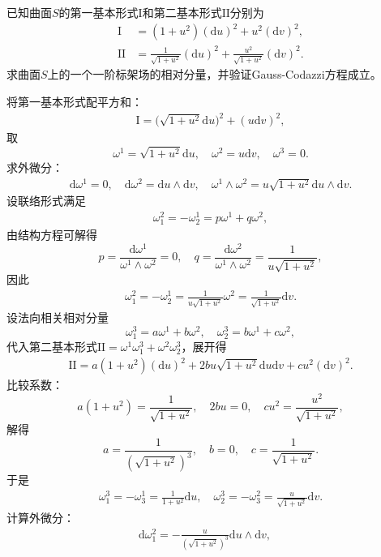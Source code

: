 \documentclass[../../main.tex]{subfiles}%
\begin{document}
\begin{example}
已知曲面$S$的第一基本形式$\mathrm{I}$和第二基本形式$\mathrm{II}$分别为
\begin{align*}
\mathrm{I} &= (1+u^2)(\mathrm{d}u)^2 + u^2(\mathrm{d}v)^2, \\
\mathrm{II} &= \frac{1}{\sqrt{1+u^2}}(\mathrm{d}u)^2 + \frac{u^2}{\sqrt{1+u^2}}(\mathrm{d}v)^2.
\end{align*}
求曲面$S$上的一个一阶标架场的相对分量，并验证Gauss-Codazzi方程成立。
\begin{solution}

将第一基本形式配平方和：
\begin{align*}
\mathrm{I} = \big(\sqrt{1+u^2}\mathrm{d}u\big)^2 + (u\mathrm{d}v)^2,
\end{align*}
取
$$\omega^1 = \sqrt{1+u^2}\mathrm{d}u,\quad \omega^2 = u\mathrm{d}v,\quad \omega^3=0.$$
求外微分：
\begin{align*}
\mathrm{d}\omega^1 = 0, \quad
\mathrm{d}\omega^2 = \mathrm{d}u\land\mathrm{d}v, \quad
\omega^1\land\omega^2 = u\sqrt{1+u^2}\mathrm{d}u\land\mathrm{d}v.
\end{align*}
设联络形式满足
\begin{align}
\omega_1^2 = -\omega_2^1 = p\omega^1 + q\omega^2, \label{eq:conn_form_def}
\end{align}
由结构方程可解得
$$p = \frac{\mathrm{d}\omega^1}{\omega^1\land\omega^2}=0,\quad q = \frac{\mathrm{d}\omega^2}{\omega^1\land\omega^2}=\frac{1}{u\sqrt{1+u^2}},$$
因此
\begin{align*}
\omega_1^2 = -\omega_2^1 = \frac{1}{u\sqrt{1+u^2}}\omega^2 = \frac{1}{\sqrt{1+u^2}}\mathrm{d}v.
\end{align*}
设法向相关相对分量
$$\omega_1^3 = a\omega^1 + b\omega^2,\quad \omega_2^3 = b\omega^1 + c\omega^2,$$
代入第二基本形式$\mathrm{II}=\omega^1\omega_1^3+\omega^2\omega_2^3$，展开得
\begin{align*}
\mathrm{II}=a(1+u^2)(\mathrm{d}u)^2 + 2bu\sqrt{1+u^2}\mathrm{d}u\mathrm{d}v + cu^2(\mathrm{d}v)^2.
\end{align*}
比较系数：
$$a(1+u^2)=\frac{1}{\sqrt{1+u^2}},\quad 2bu=0,\quad cu^2=\frac{u^2}{\sqrt{1+u^2}},$$
解得
$$a=\frac{1}{(\sqrt{1+u^2})^3},\quad b=0,\quad c=\frac{1}{\sqrt{1+u^2}}.$$
于是
\begin{align*}
\omega_1^3 = -\omega_3^1 = \frac{1}{1+u^2}\mathrm{d}u, \quad
\omega_2^3 = -\omega_3^2 = \frac{u}{\sqrt{1+u^2}}\mathrm{d}v.
\end{align*}
计算外微分：
\begin{align*}
\mathrm{d}\omega_1^2 = -\frac{u}{(\sqrt{1+u^2})^3}\mathrm{d}u\land\mathrm{d}v, \quad

\end{align*}
\end{solution}
\end{example}
\end{document}

